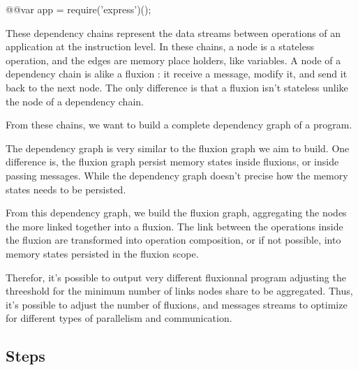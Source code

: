 \begin{code}[Javascript, caption={Hello World example for the transformation tool},label={lst:simpleB}]
@\label{lst:simpleA_depA}@var app = require('express')();
\end{code}

These dependency chains represent the data streams between operations of an application at the instruction level.
In these chains, a node is a stateless operation, and the edges are memory place holders, like variables.
A node of a dependency chain is alike a fluxion : it receive a message, modify it, and send it back to the next node.
The only difference is that a fluxion isn't stateless unlike the node of a dependency chain.



From these chains, we want to build a complete dependency graph of a program.



The dependency graph is very similar to the fluxion graph we aim to build.
One difference is, the fluxion graph persist memory states inside fluxions, or inside passing messages.
While the dependency graph doesn't precise how the memory states needs to be persisted.

From this dependency graph, we build the fluxion graph, aggregating the nodes the more linked together into a fluxion.
The link between the operations inside the fluxion are transformed into operation composition, or if not possible, into memory states persisted in the fluxion scope.

Therefor, it's possible to output very different fluxionnal program adjusting the threeshold for the minimum number of links nodes share to be aggregated.
Thus, it's possible to adjust the number of fluxions, and messages streams to optimize for different types of parallelism and communication.



\subsection{Steps}

